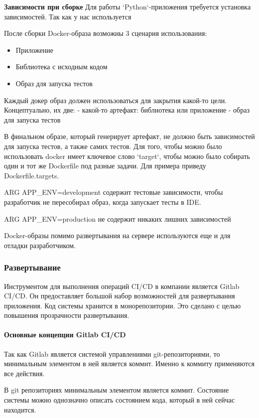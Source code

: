 \textbf{Зависимости при сборке}
Для работы `Python`-приложения требуется установка зависимостей.
Так как у нас используется

После сборки Docker-образа возможны 3 сценария использования:
\begin{itemize}
    \item Приложение
    \item Библиотека с исходным кодом
    \item Образ для запуска тестов
\end{itemize}

Каждый докер образ должен использоваться для закрытия какой-то цели. Концептуально, их две:
- какой-то артефакт: библиотека или приложение
- образ для запуска тестов

В финальном образе, который генерирует артефакт, не должно быть зависимостей для запуска тестов,
а также самих тестов.
Для того, чтобы можно было использовать docker имеет ключевое слово `target`, чтобы можно было собирать один
и тот же Dockerfile под разные задачи. Для примера приведу Dockerfile.targets.

ARG APP\_ENV=development содержит тестовые зависимости, чтобы разработчик не пересобирал образ, когда запускает тесты
в IDE.

ARG APP\_ENV=production не содержит никаких лишних зависимостей

Docker-образы помимо развертывания на сервере используются еще и для отладки разработчиком.



\subsubsection{{Развертывание}}

Инструментом для выполнения операций CI/CD в компании является Gitlab CI/CD.
Он предоставляет большой набор возможностей для развертывания приложения.
Код системы хранится в монорепозитории.
Это сделано с целью повышения прозрачности развертывания.


\paragraph{Основные концепции Gitlab CI/CD}

Так как Gitlab является системой управлениями git-репозиториями, то минимальным элементом в ней является коммит.
Именно к коммиту применяются все действия.

В git репозиториях минимальным элементом является коммит.
Состояние системы можно однозначно описать состоянием кода, который в ней сейчас находится.

